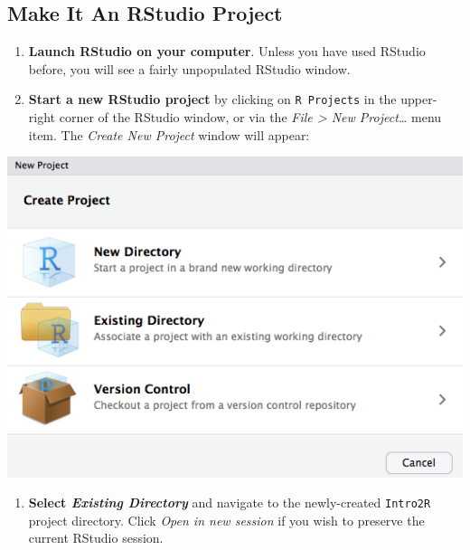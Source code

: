 \documentclass[]{book}
\providecommand{\tightlist}{%
  \setlength{\itemsep}{0pt}\setlength{\parskip}{0pt}}
\theoremstyle{definition}
\theoremstyle{definition}
\theoremstyle{definition}
\theoremstyle{remark}
\begin{document}
\hypertarget{make-it-an-rstudio-project}{%
\subsection{Make It An RStudio
Project}\label{make-it-an-rstudio-project}}

\begin{enumerate}
\def\labelenumi{\arabic{enumi}.}
\setcounter{enumi}{2}
\item
  \textbf{Launch RStudio on your computer}. Unless you have used RStudio
  before, you will see a fairly unpopulated RStudio window.
\item
  \textbf{Start a new RStudio project} by clicking on
  \texttt{R\ Projects} in the upper-right corner of the RStudio window,
  or via the \emph{File \textgreater{} New Project\ldots{}} menu item.
  The \emph{Create New Project} window will appear:
\end{enumerate}

\includegraphics{images/RStudio_new_project_window.png}

\begin{enumerate}
\def\labelenumi{\arabic{enumi}.}
\setcounter{enumi}{4}
\tightlist
\item
  \textbf{Select \emph{Existing Directory}} and navigate to the
  newly-created \texttt{Intro2R} project directory. Click \emph{Open in
  new session} if you wish to preserve the current RStudio session.
\end{enumerate}
\end{document}
